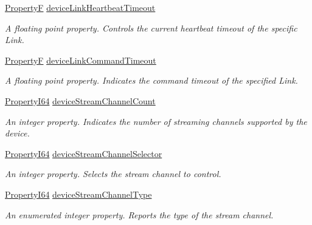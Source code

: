 \begin{DoxyCompactItemize}
\hyperlink{group___common_interface_gaf54865fe5a3d5cfd15f9a111b40d09f9}{Property\+F} \hyperlink{classmv_i_m_p_a_c_t_1_1acquire_1_1_gen_i_cam_1_1_device_control_a5615dbc0a4661b0eb0afeb403ea3b92a}{device\+Link\+Heartbeat\+Timeout}
\begin{DoxyCompactList}\small\item\em A floating point property. Controls the current heartbeat timeout of the specific Link. \end{DoxyCompactList}\item 
\hyperlink{group___common_interface_gaf54865fe5a3d5cfd15f9a111b40d09f9}{Property\+F} \hyperlink{classmv_i_m_p_a_c_t_1_1acquire_1_1_gen_i_cam_1_1_device_control_adce2792c1b6e01ef1d14747360829b1b}{device\+Link\+Command\+Timeout}
\begin{DoxyCompactList}\small\item\em A floating point property. Indicates the command timeout of the specified Link. \end{DoxyCompactList}\item 
\hyperlink{group___common_interface_ga81749b2696755513663492664a18a893}{Property\+I64} \hyperlink{classmv_i_m_p_a_c_t_1_1acquire_1_1_gen_i_cam_1_1_device_control_a4fafc834ade170cbf44bdf052a803bac}{device\+Stream\+Channel\+Count}
\begin{DoxyCompactList}\small\item\em An integer property. Indicates the number of streaming channels supported by the device. \end{DoxyCompactList}\item 
\hyperlink{group___common_interface_ga81749b2696755513663492664a18a893}{Property\+I64} \hyperlink{classmv_i_m_p_a_c_t_1_1acquire_1_1_gen_i_cam_1_1_device_control_acd2f0492412a8b7f54efdd97c6ee1925}{device\+Stream\+Channel\+Selector}
\begin{DoxyCompactList}\small\item\em An integer property. Selects the stream channel to control. \end{DoxyCompactList}\item 
\hyperlink{group___common_interface_ga81749b2696755513663492664a18a893}{Property\+I64} \hyperlink{classmv_i_m_p_a_c_t_1_1acquire_1_1_gen_i_cam_1_1_device_control_a61134540d9f136f68b7d927a67fa43f7}{device\+Stream\+Channel\+Type}
\begin{DoxyCompactList}\small\item\em An enumerated integer property. Reports the type of the stream channel. \end{DoxyCompactList}\item 

\end{DoxyCompactItemize}
